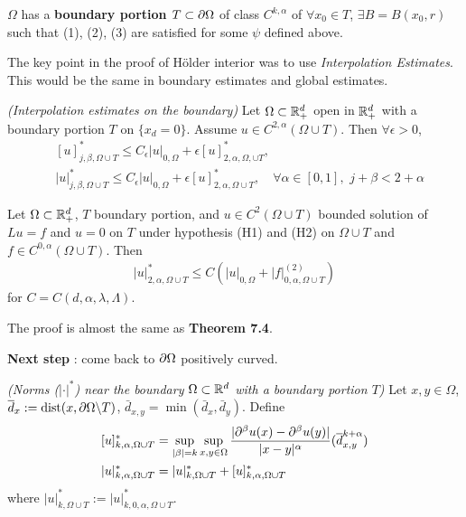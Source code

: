 \documentclass[12pt,a4paper]{article}
\newenvironment{proof}
{\begin{changemargin}{1cm}{0.5cm} 
	}%
	{\end{changemargin}
}
\newenvironment{p}
{\begin{proof} 
	}%
	{\end{proof}
}
\begin{document}
 $\Omega$ has a \textbf{boundary portion $T\subset \partial \Omega$} of class $C^{k, \alpha}$ of $\forall x_0 \in T$, $\exists B = B(x_0, r)$ such that (1), (2), (3) are satisfied for some $\psi$ defined above.
\s

The key point in the proof of H\"older interior was to use \emph{Interpolation Estimates}. This would be the same in boundary estimates and global estimates.
\s

 \emph{(Interpolation estimates on the boundary)} Let $\Omega\subset \mathbb{R}^d_+$ open in $\mathbb{R}^d_+$ with a boundary portion $T$ on $\{x_d =0\}$. Assume $u\in C^{2, \alpha}(\Omega \cup T)$. Then $\forall \epsilon >0$,
\begin{align*}
&[u]^*_{j, \beta, \Omega\cup T} \leq C_{\epsilon} |u|_{0, \Omega} + \epsilon [u]^*_{2, \alpha, \Omega, \cup T},  \\
&|u|^*_{j, \beta , \Omega\cup T} \leq C_{\epsilon}|u|_{0, \Omega} + \epsilon [u]^*_{2,\alpha, \Omega \cup T}, \quad \forall \alpha\in [0,1], \,\, j+ \beta < 2+ \alpha
\end{align*}
\s

 Let $\Omega \subset \mathbb{R}^d_+$, $T$ boundary portion, and $u \in C^2(\Omega \cup T)$ bounded solution of $Lu = f$ and $u=0$ on $T$ under hypothesis (H1) and (H2) on $\Omega \cup T$ and $f\in C^{0, \alpha}(\Omega \cup T)$. Then
\begin{align*}
|u|^{*}_{2, \alpha, \Omega \cup T}\leq C(|u|_{0, \Omega}+ |f|^{(2)}_{0, \alpha, \Omega \cup T})
\end{align*} 
for $C = C(d, \alpha, \lambda, \Lambda)$.
\begin{p}
\pf The proof is almost the same as \textbf{Theorem 7.4}.
\end{p}
\s

\textbf{Next step} : come back to $\partial \Omega$ positively curved.
\s

 \emph{(Norms ($|\cdot|^*$) near the boundary $\Omega \subset \mathbb{R}^d$ with a boundary portion $T$)} Let  $x,y \in \Omega$, $\overline{d}_x := \text{dist}(x, \partial \Omega \backslash T)$, $\bar{d}_{x,y} = \min (\bar{d}_x, \bar{d}_y)$. Define
\begin{align*}
& [u]^*_{k, \alpha, \Omega \cup T} = \sup_{|\beta|=k}\sup_{x,y\in \Omega} \frac{ |\partial^{\beta} u(x) - \partial^{\beta}u(y) |}{|x-y|^{\alpha}}(\overline{d}_{x,y}^{k+\alpha}) \\
& |u|^*_{k,\alpha, \Omega\cup T} = |u|^*_{k, \Omega\cup T} + [u]^*_{k,\alpha, \Omega\cup T}
\end{align*}
where $|u|^*_{k, \Omega\cup T} := |u|^*_{k,0,\alpha, \Omega\cup T}$.
\s
\end{document}
